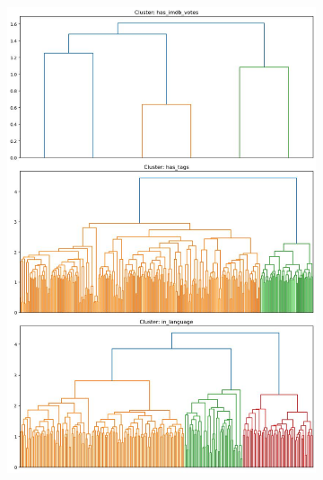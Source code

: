 \documentclass{article}
\begin{document}
\begin{figure}[ht]
\begin{subfigure}[b]{0.3\textwidth}
        \includegraphics[width=\textwidth]{HC2.jpeg}
    \end{subfigure}
    \hfill %
    \begin{subfigure}[b]{0.3\textwidth}
        \centering

\end{subfigure}
\end{figure}
\end{document}
